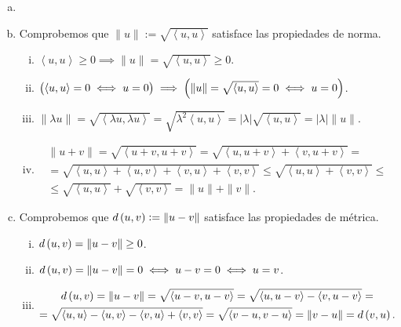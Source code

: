\begin{eje}
    \begin{enumerate}[(a)]
        \item[]
        \item Comprobemos que $\| u \| := \sqrt{\left< u, u \right>}$ satisface las propiedades de norma.
            \begin{enumerate}[i)]
                \item $\left< u, u \right> \geq 0 \implies \| u \| =  \sqrt{\left< u, u \right> } \geq 0$.
                \item $\left( \left< u, u \right> = 0 \iff u=0 \right) \implies \left( \| u \| = \sqrt{\left< u, u \right> } = 0 \iff u=0 \right)$.
                \item $\| \lambda u \| = \sqrt { \left< \lambda u, \lambda u \right> } = \sqrt {\lambda^2 \left< u, u \right> } = | \lambda | \sqrt { \left<  u,  u \right> } = | \lambda | \| u \|$.
                \item
                \begin{gather*}
                    \| u+v \| =\sqrt { \left< u + v , u+v \right>}=\sqrt { \left< u , u+v \right> + \left< v , u+v \right>}= \\
                    = \sqrt { \left< u , u\right> +\left< u , v \right> + \left< v , u \right> + \left< v , v \right>} \leq \sqrt { \left< u , u\right> + \left< v , v \right>} \leq \\
                    \leq \sqrt { \left< u , u\right>} + \sqrt{ \left< v , v \right>}= \| u \| + \| v \|.
                \end{gather*}
            \end{enumerate}
        \item Comprobemos que $d \left( u, v \right) := \| u - v \|$ satisface las propiedades de métrica.
            \begin{enumerate}[i)]
                \item $d \left( u, v \right) = \|u-v \| \geq 0$.
                \item $d\left( u, v \right) = \| u-v \| = 0 \iff u - v = 0 \iff u = v$.
                \item
                \begin{gather*}
                    d\lp u, v \rp = \| u-v \| = \sqrt { \left< u - v , u-v \right>} = \sqrt { \left< u , u-v \right> - \left< v , u-v \right>} = \\
                    = \sqrt { \left< u , u \right> - \left< u , v \right> - \left< v , u \right> + \left< v , v \right>}  = \sqrt { \left< v - u , v-u \right>} = \| v-u \| = d \lp v, u \rp.

\end{gather*}
\end{enumerate}
\end{enumerate}
\end{eje}
